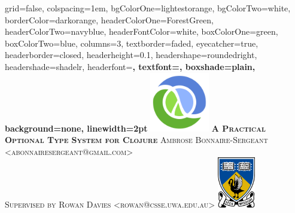\documentclass[landscape,final,a0paper,fontscale=0.277]{baposter}
\begin{document}
\begin{poster}%
  {
  grid=false,
  colspacing=1em,
  bgColorOne=lightestorange,
  bgColorTwo=white,
  borderColor=darkorange,
  headerColorOne=ForestGreen,
  headerColorTwo=navyblue,
  headerFontColor=white,
  boxColorOne=green,
  boxColorTwo=blue,
  columns=3,
  textborder=faded,
  eyecatcher=true,
  headerborder=closed,
  headerheight=0.1\textheight,
  headershape=roundedright,
  headershade=shadelr,
  headerfont=\Large\bf\textsc, %
  textfont={\setlength{\parindent}{1.5em}},
  boxshade=plain,
  background=none,
  linewidth=2pt
  }
  {\includegraphics[height=7em]{images/clojure-logo10.png}} 
  {\bf\textsc{A Practical Optional Type System for Clojure}}
  { \textsc{Ambrose Bonnaire-Sergeant <abonnairesergeant@gmail.com>}
    \\
    \textsc{{Supervised by Rowan Davies <rowan@csse.uwa.edu.au>}}}
  {%
    \includegraphics[height=6.0em]{images/1000px-UWA_crest.png}
  }
%
%   


\end{poster}
\end{document}
